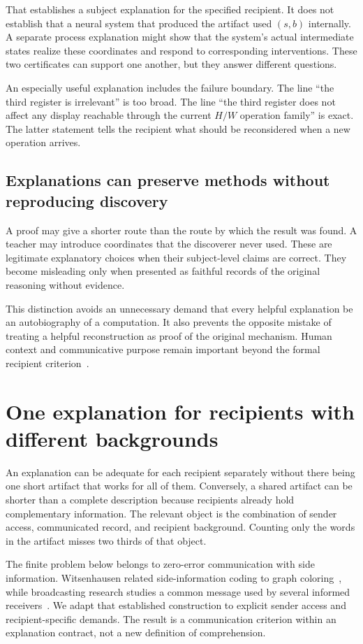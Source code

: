 That establishes a subject explanation for the specified recipient. It does not establish that a neural system that produced the artifact used $(s,b)$ internally. A separate process explanation might show that the system's actual intermediate states realize these coordinates and respond to corresponding interventions. These two certificates can support one another, but they answer different questions.

An especially useful explanation includes the failure boundary. The line ``the third register is irrelevant'' is too broad. The line ``the third register does not affect any display reachable through the current $H/W$ operation family'' is exact. The latter statement tells the recipient what should be reconsidered when a new operation arrives.

\subsection{Explanations can preserve methods without reproducing discovery}
A proof may give a shorter route than the route by which the result was found. A teacher may introduce coordinates that the discoverer never used. These are legitimate explanatory choices when their subject-level claims are correct. They become misleading only when presented as faithful records of the original reasoning without evidence.

This distinction avoids an unnecessary demand that every helpful explanation be an autobiography of a computation. It also prevents the opposite mistake of treating a helpful reconstruction as proof of the original mechanism. Human context and communicative purpose remain important beyond the formal recipient criterion~\cite{MU:miller}.

\section{One explanation for recipients with different backgrounds}\label{MU:sec:audience}
An explanation can be adequate for each recipient separately without there being one short artifact that works for all of them. Conversely, a shared artifact can be shorter than a complete description because recipients already hold complementary information. The relevant object is the combination of sender access, communicated record, and recipient background. Counting only the words in the artifact misses two thirds of that object.

The finite problem below belongs to zero-error communication with side information. Witsenhausen related side-information coding to graph coloring~\cite{MU:witsenhausen}, while broadcasting research studies a common message used by several informed receivers~\cite{MU:alon}. We adapt that established construction to explicit sender access and recipient-specific demands. The result is a communication criterion within an explanation contract, not a new definition of comprehension.

